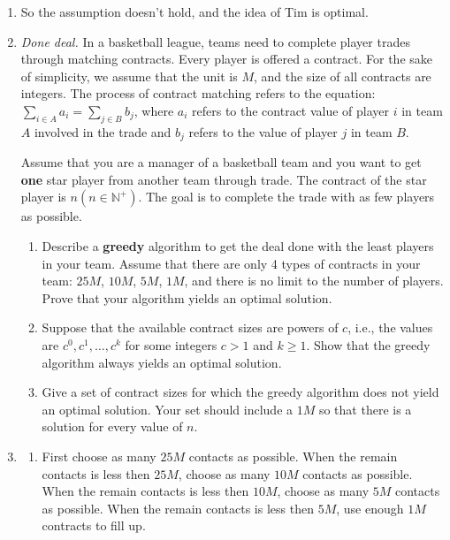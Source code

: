 \documentclass[12pt,a4paper]{article}
\makeatletter
\newtheorem*{solution}{Solution}
\theoremstyle{definition}
\renewenvironment{solution}[1][Solution] {\par\pushQED{\qed}\normalfont\topsep6\p@\@plus6\p@\relax\trivlist\item[\hskip\labelsep\bfseries#1\@addpunct{.}]\ignorespaces}{\popQED\endtrivlist\@endpefalse} \makeatother
\makeatother
\begin{document}
\begin{enumerate}
\begin{solution}
	        So the assumption doesn't hold, and the idea of Tim is optimal.
	    \end{solution}
	
	\item \textit{Done deal.} In a basketball league, teams need to complete player trades through matching contracts. Every player is offered a contract. For the sake of simplicity, we assume that the unit is $ M $, and the size of all contracts are integers. The process of contract matching refers to the equation: $ \sum_{i\in A} a_{i}=\sum_{j\in B} b_{j} $, where $ a_{i} $ refers to the contract value of player $ i $ in team $A$ involved in the trade and $ b_{j} $ refers to the value of player $ j $ in team $B$. 
	
	Assume that you are a manager of a basketball team and you want to get \textbf{one} star player from another team through trade. The contract of the star player is $ n (n\in \mathbb{N}^+) $. The goal is to complete the trade with as few players as possible. 
	
	\begin{enumerate}
		\item Describe a \textbf{greedy} algorithm to get the deal done with the least players in your team. Assume that there are only 4 types of contracts in your team: $25M$, $ 10M $, $ 5M $, $ 1M $, and there is no limit to the number of players. Prove that your algorithm yields an optimal solution.
		\item Suppose that the available contract sizes are powers of $c$,
		i.e., the values are $c^{0}, c^{1}, \ldots, c^{k}$ for some integers $c>1$ and $k \geq 1$. Show that the greedy algorithm always yields an optimal solution.
		\item Give a set of contract sizes for which the greedy algorithm does not yield an optimal solution. Your set should include a $ 1M $ so that there is a solution for every value of $ n $.
	\end{enumerate}
    \begin{solution}
        \begin{enumerate}
        \item First choose as many $25M$ contacts as possible. When the remain contacts is less then $25M$, choose as many $10M$ contacts as possible. When the remain contacts is less then $10M$, choose as many $5M$ contacts as possible. When the remain contacts is less then $5M$, use enough $1M$ contracts to fill up.
        

\end{enumerate}
\end{solution}
\end{enumerate}
\end{document}
